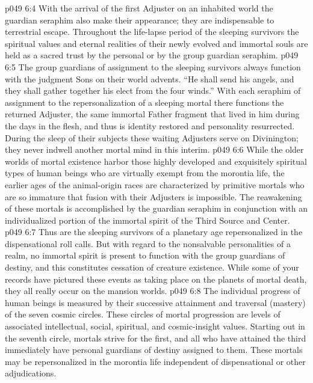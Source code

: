 \pc \vs p049 6:4 \bibnobreakspace {} With the arrival of the first Adjuster on an inhabited world the guardian seraphim also make their appearance; they are indispensable to terrestrial escape. Throughout the life\hyp{}lapse period of the sleeping survivors the spiritual values and eternal realities of their newly evolved and immortal souls are held as a sacred trust by the personal or by the group guardian seraphim.
\vs p049 6:5 The group guardians of assignment to the sleeping survivors always function with the judgment Sons on their world advents. “He shall send his angels, and they shall gather together his elect from the four winds.” With each seraphim of assignment to the repersonalization of a sleeping mortal there functions the returned Adjuster, the same immortal Father fragment that lived in him during the days in the flesh, and thus is identity restored and personality resurrected. During the sleep of their subjects these waiting Adjusters serve on Divinington; they never indwell another mortal mind in this interim.
\vs p049 6:6 While the older worlds of mortal existence harbor those highly developed and exquisitely spiritual types of human beings who are virtually exempt from the morontia life, the earlier ages of the animal\hyp{}origin races are characterized by primitive mortals who are so immature that fusion with their Adjusters is impossible. The reawakening of these mortals is accomplished by the guardian seraphim in conjunction with an individualized portion of the immortal spirit of the Third Source and Center.
\vs p049 6:7 Thus are the sleeping survivors of a planetary age repersonalized in the dispensational roll calls. But with regard to the nonsalvable personalities of a realm, no immortal spirit is present to function with the group guardians of destiny, and this constitutes cessation of creature existence. While some of your records have pictured these events as taking place on the planets of mortal death, they all really occur on the mansion worlds.
\pc \vs p049 6:8 \bibnobreakspace {} The individual progress of human beings is measured by their successive attainment and traversal (mastery) of the seven cosmic circles. These circles of mortal progression are levels of associated intellectual, social, spiritual, and cosmic\hyp{}insight values. Starting out in the seventh circle, mortals strive for the first, and all who have attained the third immediately have personal guardians of destiny assigned to them. These mortals may be repersonalized in the morontia life independent of dispensational or other adjudications.
